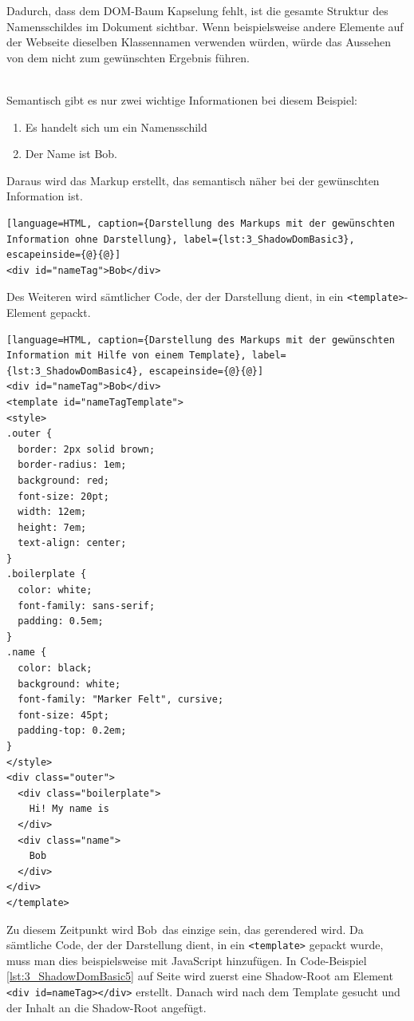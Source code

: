 Dadurch, dass dem DOM-Baum Kapselung fehlt, ist die gesamte Struktur des Namensschildes im Dokument sichtbar. Wenn beispielsweise andere Elemente auf der Webseite dieselben Klassennamen verwenden würden, würde das Aussehen von dem nicht zum gewünschten Ergebnis führen.

\begin{enumerate}
 \hfill \\
Semantisch gibt es nur zwei wichtige Informationen bei diesem Beispiel:
\begin{enumerate}
\item Es handelt sich um ein Namensschild
\item Der Name ist \glqq Bob\grqq .
\end{enumerate}
Daraus wird das Markup erstellt, das semantisch näher bei der gewünschten Information ist.

\begin{lstlisting}[language=HTML, caption={Darstellung des Markups mit der gewünschten Information ohne Darstellung}, label={lst:3_ShadowDomBasic3}, escapeinside={@}{@}]
<div id="nameTag">Bob</div>
\end{lstlisting}

Des Weiteren wird sämtlicher Code, der der Darstellung dient, in ein \lstinline|<template>|-Element gepackt.

\begin{lstlisting}[language=HTML, caption={Darstellung des Markups mit der gewünschten Information mit Hilfe von einem Template}, label={lst:3_ShadowDomBasic4}, escapeinside={@}{@}]
<div id="nameTag">Bob</div>
<template id="nameTagTemplate">
<style>
.outer {
  border: 2px solid brown;
  border-radius: 1em;
  background: red;
  font-size: 20pt;
  width: 12em;
  height: 7em;
  text-align: center;
}
.boilerplate {
  color: white;
  font-family: sans-serif;
  padding: 0.5em;
}
.name {
  color: black;
  background: white;
  font-family: "Marker Felt", cursive;
  font-size: 45pt;
  padding-top: 0.2em;
}
</style>
<div class="outer">
  <div class="boilerplate">
    Hi! My name is
  </div>
  <div class="name">
    Bob
  </div>
</div>
</template>
\end{lstlisting}

Zu diesem Zeitpunkt wird \glqq Bob\grqq\ das einzige sein, das gerendered wird. Da sämtliche Code, der der Darstellung dient, in ein \lstinline|<template>| gepackt wurde, muss man dies beispielsweise mit JavaScript hinzufügen. In Code-Beispiel \ref{lst:3_ShadowDomBasic5} auf Seite \pageref{lst:3_ShadowDomBasic5} wird zuerst eine Shadow-Root am Element \lstinline|<div id=nameTag></div>| erstellt. Danach wird nach dem Template gesucht und der Inhalt an die Shadow-Root angefügt.


\end{enumerate}
